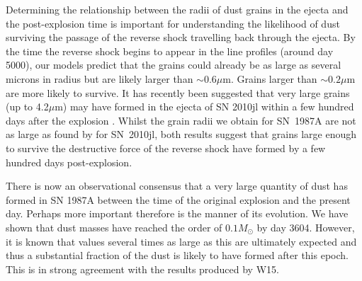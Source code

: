 \documentclass[useAMS,usenatbib,usegraphicx]{mnras}
\begin{document}
Determining the relationship between the radii of dust grains in the ejecta 
and the  post-explosion time is important for understanding the likelihood 
of dust surviving the passage of the reverse shock travelling back through 
the ejecta. By the time the reverse shock begins to appear in the line 
profiles (around day 5000), our models predict that the grains could 
already be as large as several microns in radius but are likely larger 
than $\sim 0.6\mu$m.  Grains larger than $\sim 0.2\mu$m are more likely to 
survive.  It has recently been 
suggested that very large grains (up to 4.2$\mu$m) may have formed in the 
ejecta of SN 2010jl within a few hundred days after the explosion \cite{Gall2014}.
Whilst the grain radii we obtain for SN~1987A are not as large as found by \citet{Gall2014} for SN~2010jl,
 both results suggest that grains large enough to survive the 
destructive force of the reverse shock have formed by a few hundred days 
post-explosion.

%
%
%
%


There is now an observational consensus that a very large quantity of dust has 
formed in SN 1987A between the time of the original explosion and the 
present day.  Perhaps more important therefore is the manner of its 
evolution.  We have shown that dust masses have reached the order of 
$0.1M_{\odot}$ by day 3604.  However, it is known that values several 
times as large as this are ultimately expected and thus a substantial 
fraction of the dust is likely to have formed after this epoch.  This is in 
strong agreement with the results produced by W15. 
\end{document}
